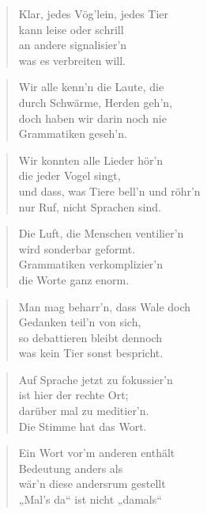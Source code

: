 \documentclass[10pt,a4paper]{article}
\begin{document}
\begin{paracol}{2}
\begin{verse}
Klar, jedes Vög’lein, jedes Tier \\
kann leise oder schrill \\
an andere signalisier’n \\
was es verbreiten will. \\
\end{verse}

\begin{verse}
Wir alle kenn’n die Laute, die \\
durch Schwärme, Herden geh’n, \\
doch haben wir darin noch nie \\
Grammatiken geseh’n. \\
\end{verse}

\begin{verse}
Wir konnten alle Lieder hör’n \\
die jeder Vogel singt, \\
und dass, was Tiere bell’n und röhr’n \\
nur Ruf, nicht Sprachen sind. \\
\end{verse}

\begin{verse}
Die Luft, die Menschen ventilier’n \\
wird sonderbar geformt. \\
Grammatiken verkomplizier’n \\
die Worte ganz enorm. \\
\end{verse}

\begin{verse}
Man mag beharr’n, dass Wale doch \\
Gedanken teil’n von sich, \\
so debattieren bleibt dennoch \\
was kein Tier sonst bespricht. \\
\end{verse}

\begin{verse}
Auf Sprache jetzt zu fokussier’n \\
ist hier der rechte Ort; \\
darüber mal zu meditier’n. \\
Die Stimme hat das Wort. \\
\end{verse}

\begin{verse}
Ein Wort vor’m anderen enthält \\
Bedeutung anders als \\
wär’n diese andersrum gestellt \\
„Mal’s da“ ist nicht „damals“ \\
\end{verse}


\end{paracol}
\end{document}
